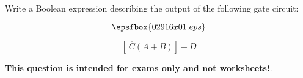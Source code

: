 

Write a Boolean expression describing the output of the following gate circuit:

$$\epsfbox{02916x01.eps}$$







$$\left[ \> \overline{C}(A + B) \right] + D$$







{\bf This question is intended for exams only and not worksheets!}.





